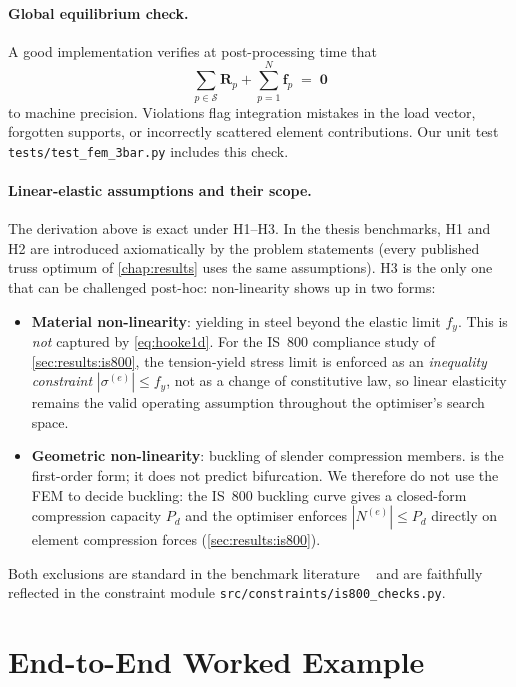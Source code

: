 \paragraph{Global equilibrium check.} A good implementation
verifies at post-processing time that
\begin{equation}
  \sum_{p\in\mathcal{S}}\mathbf{R}_p + \sum_{p=1}^{N}\mathbf{f}_p
  \;=\;\mathbf{0}
  \label{eq:global_equilibrium}
\end{equation}
to machine precision. Violations flag integration mistakes in
the load vector, forgotten supports, or incorrectly scattered
element contributions. Our unit test
\texttt{tests/test\_fem\_3bar.py} includes this check.

\paragraph{Linear-elastic assumptions and their scope.} The
derivation above is exact under H1--H3. In the thesis
benchmarks, H1 and H2 are introduced axiomatically by the
problem statements (every published truss optimum of
\cref{chap:results} uses the same assumptions). H3 is the only
one that can be challenged post-hoc: non-linearity shows up in
two forms:
\begin{itemize}
  \item \textbf{Material non-linearity}: yielding in steel beyond
    the elastic limit $f_y$. This is \emph{not} captured by
    \cref{eq:hooke1d}. For the IS~800 compliance study of
    \cref{sec:results:is800}, the tension-yield stress limit
    is enforced as an \emph{inequality constraint}
    $|\sigma^{(e)}|\le f_y$, not as a change of constitutive
    law, so linear elasticity remains the valid operating
    assumption throughout the optimiser's search space.
  \item \textbf{Geometric non-linearity}: buckling of slender
    compression members.  is the
    first-order form; it does not predict bifurcation. We
    therefore do not use the FEM to decide buckling: the IS~800
    buckling curve gives a closed-form compression capacity
    $P_d$ and the optimiser enforces $|N^{(e)}|\le P_d$ directly
    on element compression forces
    (\cref{sec:results:is800}).
\end{itemize}
Both exclusions are standard in the benchmark literature
~\cite{subramanian2008,is800-2007} and are faithfully reflected
in the constraint module \texttt{src/constraints/is800\_checks.py}.

\section{End-to-End Worked Example}
\label{app:fem:worked}

